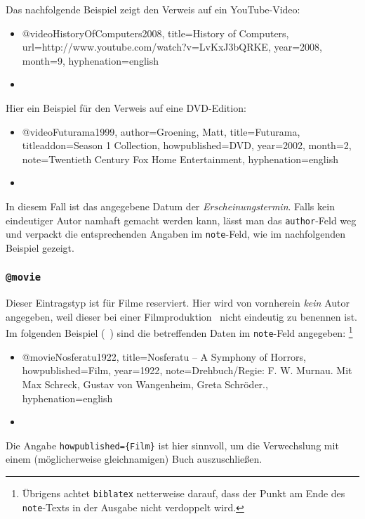 Das nachfolgende Beispiel zeigt den Verweis auf ein YouTube-Video:
%
\begin{itemize}
\item[]
\begin{GenericCode}[numbers=none]
@video{HistoryOfComputers2008,
  title={History of Computers},
	url={http://www.youtube.com/watch?v=LvKxJ3bQRKE},
  year={2008},
  month={9},
  hyphenation={english}
}
\end{GenericCode}
\item[\cite{HistoryOfComputers2008}] 
\end{itemize}

\noindent
Hier ein Beispiel für den Verweis auf eine DVD-Edition:
%
\begin{itemize}
\item[] 
\begin{GenericCode}[numbers=none]
@video{Futurama1999,
  author={Groening, Matt},
  title={Futurama},
  titleaddon={Season 1 Collection},
  howpublished={DVD},
  year={2002},
  month={2},
  note={Twentieth Century Fox Home Entertainment},
  hyphenation={english}
 }
\end{GenericCode}
\item[\cite{Futurama1999}] 
\end{itemize}
%
In diesem Fall ist das angegebene Datum der \emph{Erscheinungstermin}. 
Falls kein eindeutiger Autor namhaft gemacht werden kann, lässt man das
\texttt{author}-Feld weg und verpackt die entsprechenden Angaben im \texttt{note}-Feld, wie im nachfolgenden Beispiel gezeigt.




\subsubsection{\texttt{@movie}}
\label{sec:@movie}
Dieser Eintragstyp ist für Filme reserviert. 
Hier wird von vornherein \emph{kein} Autor angegeben, weil dieser bei 
einer Filmproduktion \ia\ nicht eindeutig zu benennen ist. 
Im folgenden Beispiel (\sa\ \cite{Psycho1960}) sind die betreffenden Daten 
im \texttt{note}-Feld angegeben:%
\footnote{Übrigens achtet \texttt{biblatex} netterweise darauf, dass der  
Punkt am Ende des \texttt{note}-Texts in der Ausgabe nicht verdoppelt wird.}
%
\begin{itemize}
\item[] 
\begin{GenericCode}[numbers=none]
@movie{Nosferatu1922,
  title={Nosferatu -- A Symphony of Horrors},
  howpublished={Film},
  year={1922},
  note={Drehbuch/Regie: F. W. Murnau. Mit Max Schreck, Gustav von Wangenheim, Greta Schröder.},
  hyphenation={english}
}
\end{GenericCode}
\item[\cite{Nosferatu1922}] 
\end{itemize}
%
Die Angabe \verb!howpublished={Film}! ist hier sinnvoll, um die Verwechslung
mit einem (möglicherweise gleichnamigen) Buch auszuschließen.



